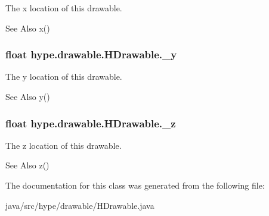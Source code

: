 The x location of this drawable. 

\begin{DoxySeeAlso}{See Also}
x() 
\end{DoxySeeAlso}
\hypertarget{classhype_1_1drawable_1_1_h_drawable_a42f6ddcf3b67293eab4d61d08eccbd5c}{
\subsubsection[{\-\_\-y}]{\setlength{\rightskip}{0pt plus 5cm}float hype.\-drawable.\-H\-Drawable.\-\_\-y\hspace{0.3cm}{\ttfamily [protected]}}}\label{classhype_1_1drawable_1_1_h_drawable_a42f6ddcf3b67293eab4d61d08eccbd5c}


The y location of this drawable. 

\begin{DoxySeeAlso}{See Also}
y() 
\end{DoxySeeAlso}
\hypertarget{classhype_1_1drawable_1_1_h_drawable_a3d0f13d023b008b211fdb60a87ade649}{
\subsubsection[{\-\_\-z}]{\setlength{\rightskip}{0pt plus 5cm}float hype.\-drawable.\-H\-Drawable.\-\_\-z\hspace{0.3cm}{\ttfamily [protected]}}}\label{classhype_1_1drawable_1_1_h_drawable_a3d0f13d023b008b211fdb60a87ade649}


The z location of this drawable. 

\begin{DoxySeeAlso}{See Also}
z() 
\end{DoxySeeAlso}


The documentation for this class was generated from the following file\-:\begin{DoxyCompactItemize}
\item 
java/src/hype/drawable/H\-Drawable.\-java\end{DoxyCompactItemize}
